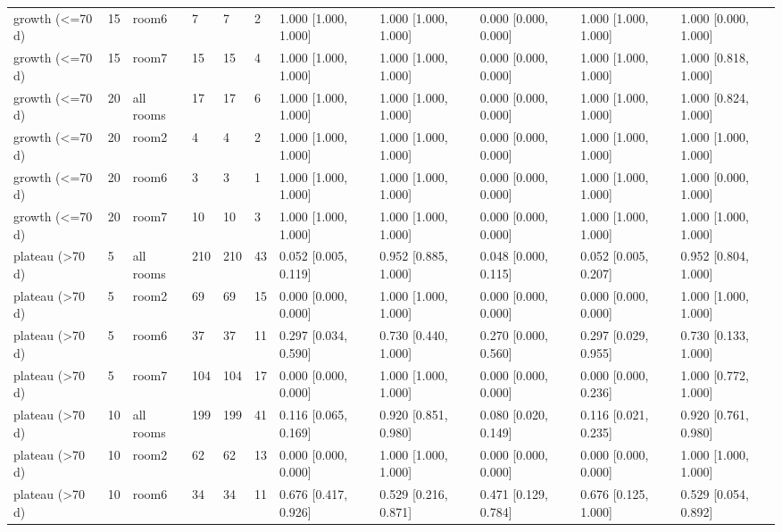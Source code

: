 \begin{tabular}{lllllllllll}
growth (<=70 d) & 15 & room6 & 7 & 7 & 2 & 1.000 [1.000, 1.000] & 1.000 [1.000, 1.000] & 0.000 [0.000, 0.000] & 1.000 [1.000, 1.000] & 1.000 [0.000, 1.000] \\
growth (<=70 d) & 15 & room7 & 15 & 15 & 4 & 1.000 [1.000, 1.000] & 1.000 [1.000, 1.000] & 0.000 [0.000, 0.000] & 1.000 [1.000, 1.000] & 1.000 [0.818, 1.000] \\
growth (<=70 d) & 20 & all rooms & 17 & 17 & 6 & 1.000 [1.000, 1.000] & 1.000 [1.000, 1.000] & 0.000 [0.000, 0.000] & 1.000 [1.000, 1.000] & 1.000 [0.824, 1.000] \\
growth (<=70 d) & 20 & room2 & 4 & 4 & 2 & 1.000 [1.000, 1.000] & 1.000 [1.000, 1.000] & 0.000 [0.000, 0.000] & 1.000 [1.000, 1.000] & 1.000 [1.000, 1.000] \\
growth (<=70 d) & 20 & room6 & 3 & 3 & 1 & 1.000 [1.000, 1.000] & 1.000 [1.000, 1.000] & 0.000 [0.000, 0.000] & 1.000 [1.000, 1.000] & 1.000 [0.000, 1.000] \\
growth (<=70 d) & 20 & room7 & 10 & 10 & 3 & 1.000 [1.000, 1.000] & 1.000 [1.000, 1.000] & 0.000 [0.000, 0.000] & 1.000 [1.000, 1.000] & 1.000 [1.000, 1.000] \\
plateau (>70 d) & 5 & all rooms & 210 & 210 & 43 & 0.052 [0.005, 0.119] & 0.952 [0.885, 1.000] & 0.048 [0.000, 0.115] & 0.052 [0.005, 0.207] & 0.952 [0.804, 1.000] \\
plateau (>70 d) & 5 & room2 & 69 & 69 & 15 & 0.000 [0.000, 0.000] & 1.000 [1.000, 1.000] & 0.000 [0.000, 0.000] & 0.000 [0.000, 0.000] & 1.000 [1.000, 1.000] \\
plateau (>70 d) & 5 & room6 & 37 & 37 & 11 & 0.297 [0.034, 0.590] & 0.730 [0.440, 1.000] & 0.270 [0.000, 0.560] & 0.297 [0.029, 0.955] & 0.730 [0.133, 1.000] \\
plateau (>70 d) & 5 & room7 & 104 & 104 & 17 & 0.000 [0.000, 0.000] & 1.000 [1.000, 1.000] & 0.000 [0.000, 0.000] & 0.000 [0.000, 0.236] & 1.000 [0.772, 1.000] \\
plateau (>70 d) & 10 & all rooms & 199 & 199 & 41 & 0.116 [0.065, 0.169] & 0.920 [0.851, 0.980] & 0.080 [0.020, 0.149] & 0.116 [0.021, 0.235] & 0.920 [0.761, 0.980] \\
plateau (>70 d) & 10 & room2 & 62 & 62 & 13 & 0.000 [0.000, 0.000] & 1.000 [1.000, 1.000] & 0.000 [0.000, 0.000] & 0.000 [0.000, 0.000] & 1.000 [1.000, 1.000] \\
plateau (>70 d) & 10 & room6 & 34 & 34 & 11 & 0.676 [0.417, 0.926] & 0.529 [0.216, 0.871] & 0.471 [0.129, 0.784] & 0.676 [0.125, 1.000] & 0.529 [0.054, 0.892] \\

\end{tabular}
